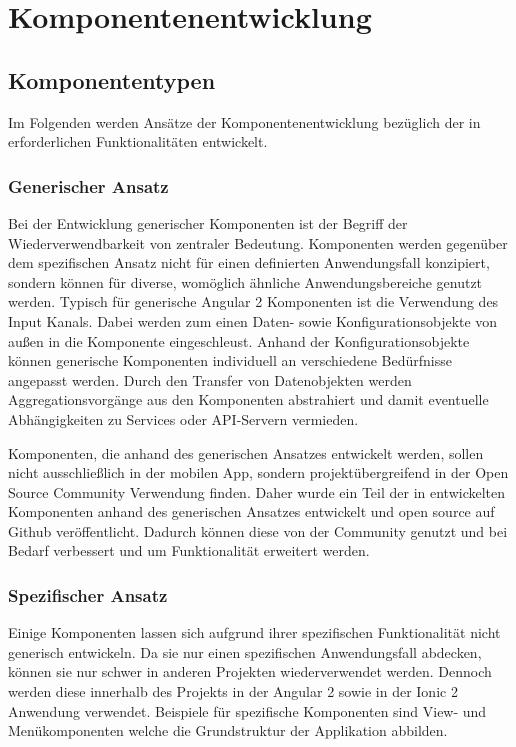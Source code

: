 \section{Komponentenentwicklung}

\subsection{Komponententypen}

Im Folgenden werden Ansätze der Komponentenentwicklung bezüglich der in
\projectname{} erforderlichen Funktionalitäten entwickelt.


\subsubsection{Generischer Ansatz}

Bei der Entwicklung generischer Komponenten ist der Begriff der Wiederverwendbarkeit von zentraler Bedeutung.
Komponenten werden gegenüber dem spezifischen Ansatz nicht für einen definierten Anwendungsfall konzipiert,
sondern können
für diverse, womöglich ähnliche Anwendungsbereiche genutzt werden.
Typisch für generische Angular 2 Komponenten ist die Verwendung des Input Kanals.
Dabei werden zum einen Daten- sowie Konfigurationsobjekte von außen in die Komponente eingeschleust.
Anhand der Konfigurationsobjekte können generische Komponenten individuell an verschiedene Bedürfnisse angepasst werden.
Durch den Transfer von Datenobjekten werden Aggregationsvorgänge aus den Komponenten abstrahiert und damit eventuelle
Abhängigkeiten zu Services oder API-Servern vermieden.

Komponenten,
die anhand des generischen Ansatzes entwickelt werden,
sollen nicht ausschließlich in der mobilen App,
sondern projektübergreifend in der Open Source Community Verwendung finden.
Daher wurde ein Teil der in \projectname{} entwickelten Komponenten anhand des generischen Ansatzes
entwickelt und open source auf Github veröffentlicht.
Dadurch können diese von der Community genutzt und bei Bedarf verbessert und um Funktionalität erweitert werden.


\subsubsection{Spezifischer Ansatz}

Einige Komponenten lassen sich aufgrund ihrer spezifischen Funktionalität nicht generisch entwickeln.
Da sie nur einen spezifischen Anwendungsfall abdecken, können sie nur schwer in anderen Projekten wiederverwendet werden.
Dennoch werden diese innerhalb des Projekts \projectname{}
in der Angular 2 sowie in der Ionic 2 Anwendung verwendet.
Beispiele für spezifische Komponenten sind View- und Menükomponenten welche die Grundstruktur der Applikation abbilden.

